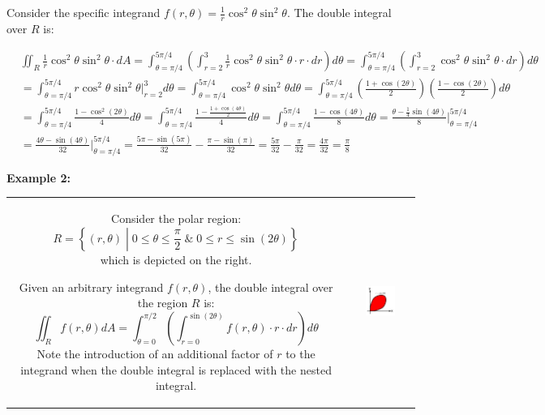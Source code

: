 \documentclass{article}
\begin{document}
Consider the specific integrand \(f(r,\theta) = \frac{1}{r}\cos^2\theta\sin^2\theta\). The double integral over \(R\) is:

\begin{align*}
& \iint_R \frac{1}{r}\cos^2\theta\sin^2\theta \cdot dA
= \int_{\theta = \pi/4}^{5\pi/4} \left(\int_{r = 2}^3 \frac{1}{r}\cos^2\theta\sin^2\theta \cdot r \cdot dr\right)d\theta  
= \int_{\theta = \pi/4}^{5\pi/4} \left(\int_{r = 2}^3 \cos^2\theta\sin^2\theta \cdot dr\right)d\theta \\
& = \int_{\theta = \pi/4}^{5\pi/4} r\cos^2\theta\sin^2\theta\Big|_{r = 2}^3 d\theta 
= \int_{\theta = \pi/4}^{5\pi/4} \cos^2\theta\sin^2\theta d\theta 
= \int_{\theta = \pi/4}^{5\pi/4} \left(\frac{1 + \cos(2\theta)}{2}\right)\left(\frac{1 - \cos(2\theta)}{2}\right) d\theta \\ 
& = \int_{\theta = \pi/4}^{5\pi/4} \frac{1 - \cos^2(2\theta)}{4} d\theta 
= \int_{\theta = \pi/4}^{5\pi/4} \frac{1 - \frac{1 + \cos(4\theta)}{2}}{4} d\theta  
= \int_{\theta = \pi/4}^{5\pi/4} \frac{1 - \cos(4\theta)}{8} d\theta  
= \frac{\theta - \frac{1}{4}\sin(4\theta)}{8}\Big|_{\theta = \pi/4}^{5\pi/4} \\  
& = \frac{4\theta - \sin(4\theta)}{32}\Big|_{\theta = \pi/4}^{5\pi/4} 
= \frac{5\pi - \sin(5\pi)}{32} - \frac{\pi - \sin(\pi)}{32}     
= \frac{5\pi}{32} - \frac{\pi}{32} 
= \frac{4\pi}{32}
= \frac{\pi}{8}
\end{align*}




\vspace{5mm}

\textbf{Example 2:}

\begin{tabular}{cc}
\parbox{0.5\textwidth}{
Consider the polar region:
\[R = \left\{(r, \theta) \middle| 0 \leq \theta \leq \frac{\pi}{2} \;\&\; 0 \leq r \leq \sin(2\theta) \right\}\]
which is depicted on the right. 

Given an arbitrary integrand \(f(r,\theta)\), the double integral over the region \(R\) is: 
\[\iint_R f(r,\theta)dA = \int_{\theta = 0}^{\pi/2} \left(\int_{r = 0}^{\sin(2\theta)} f(r, \theta) \cdot r \cdot dr\right)d\theta\]
Note the introduction of an additional factor of \(r\) to the integrand when the double integral is replaced with the nested integral.
} & \parbox{0.5\textwidth}{
\includegraphics[width = 0.5\textwidth]{Polar_region_2}
}
\end{tabular}
\end{document}
